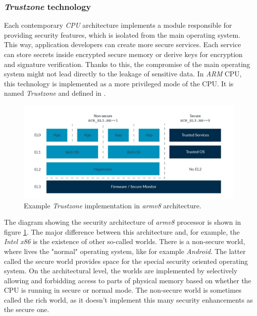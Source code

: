\subsubsection{\textit{Trustzone} technology} \label{sec:tz}
Each contemporary \textit{CPU} architecture implements a module responsible for providing security features, which is isolated from the main operating system. This way, application developers can create more secure services. Each service can store secrets inside encrypted secure memory or derive keys for encryption and signature verification. Thanks to this, the compromise of the main operating system might not lead directly to the leakage of sensitive data. In \textit{ARM} CPU, this technology is implemented as a more privileged mode of the CPU. It is named \textit{Trustzone} and defined in \cite{trustzonedoc}.

\begin{figure}
    \centering
    \includegraphics[width=.9\linewidth]{tex/img/trustzone.jpg}
    \caption{Example \textit{Trustzone} implementation in \textit{armv8} architecture.}
    \label{fig:tzarmv8}
\end{figure}

The diagram showing the security architecture of \textit{armv8} processor is shown in figure \ref{fig:tzarmv8}. The major difference between this architecture and, for example, the \textit{Intel x86} is the existence of other so-called worlds. There is a non-secure world, where lives the "normal" operating system, like for example \textit{Android}. The latter called the secure world provides space for the special security oriented operating system. On the architectural level, the worlds are implemented by selectively allowing and forbidding access to parts of physical memory based on whether the CPU is running in secure or normal mode. The non-secure world is sometimes called the rich world, as it doesn't implement this many security enhancements as the secure one.

